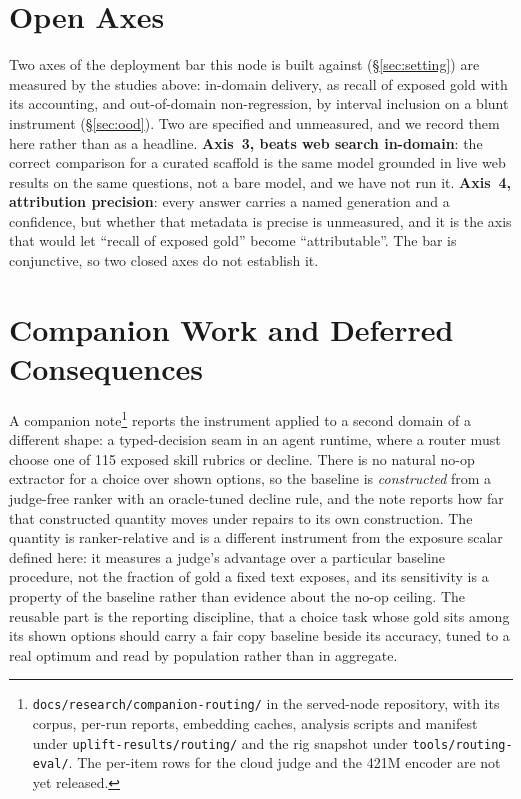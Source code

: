 \documentclass[10pt,twocolumn]{article}
\begin{document}
\section{Open Axes}\label{sec:roadmap}
Two axes of the deployment bar this node is built against (\S\ref{sec:setting}) are measured by the studies above: in-domain delivery, as recall of exposed gold with its accounting, and out-of-domain non-regression, by interval inclusion on a blunt instrument (\S\ref{sec:ood}). Two are specified and unmeasured, and we record them here rather than as a headline.\label{sec:bar} \textbf{Axis~3, beats web search in-domain}: the correct comparison for a curated scaffold is the same model grounded in live web results on the same questions, not a bare model, and we have not run it. \textbf{Axis~4, attribution precision}: every answer carries a named generation and a confidence, but whether that metadata is precise is unmeasured, and it is the axis that would let ``recall of exposed gold'' become ``attributable''. The bar is conjunctive, so two closed axes do not establish it.

\section{Companion Work and Deferred Consequences}\label{sec:companion}
A companion note\footnote{\texttt{docs/research/companion-routing/} in the served-node repository, with its corpus, per-run reports, embedding caches, analysis scripts and manifest under \texttt{uplift-results/routing/} and the rig snapshot under \texttt{tools/routing-eval/}. The per-item rows for the cloud judge and the 421M encoder are not yet released.} reports the instrument applied to a second domain of a different shape: a typed-decision seam in an agent runtime, where a router must choose one of 115 exposed skill rubrics or decline. There is no natural no-op extractor for a choice over shown options, so the baseline is \emph{constructed} from a judge-free ranker with an oracle-tuned decline rule, and the note reports how far that constructed quantity moves under repairs to its own construction. The quantity is ranker-relative and is a different instrument from the exposure scalar defined here: it measures a judge's advantage over a particular baseline procedure, not the fraction of gold a fixed text exposes, and its sensitivity is a property of the baseline rather than evidence about the no-op ceiling. The reusable part is the reporting discipline, that a choice task whose gold sits among its shown options should carry a fair copy baseline beside its accuracy, tuned to a real optimum and read by population rather than in aggregate.
\end{document}
